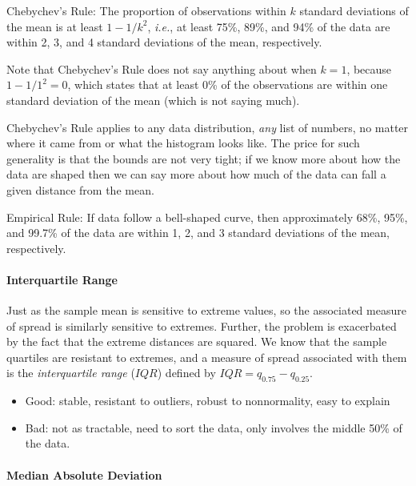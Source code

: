 \documentclass[captions=tableheading]{scrbook}
\begin{document}
\begin{fact}
Chebychev's Rule: The proportion of observations within \(k\) standard deviations of the mean is at least \(1-1/k^{2}\), \emph{i.e.}, at least 75\%, 89\%, and 94\% of the data are within 2, 3, and 4 standard deviations of the mean, respectively.
\end{fact}

Note that Chebychev's Rule does not say anything about when \(k=1\), because \(1-1/1^{2}=0\), which states that at least 0\% of the observations are within one standard deviation of the mean (which is not saying much).

Chebychev's Rule applies to any data distribution, \emph{any} list of numbers, no matter where it came from or what the histogram looks like. The price for such generality is that the bounds are not very tight; if we know more about how the data are shaped then we can say more about how much of the data can fall a given distance from the mean.

\begin{fact}
\label{fac:Empirical-Rule}
Empirical Rule: If data follow a bell-shaped curve, then approximately 68\%, 95\%, and 99.7\% of the data are within 1, 2, and 3 standard deviations of the mean, respectively. 
\end{fact}


\paragraph*{Interquartile Range}

Just as the sample mean is sensitive to extreme values, so the associated measure of spread is similarly sensitive to extremes. Further, the problem is exacerbated by the fact that the extreme distances are squared. We know that the sample quartiles are resistant to extremes, and a measure of spread associated with them is the \emph{interquartile range} (\(IQR\)) defined by \(IQR=q_{0.75}-q_{0.25}\).

\begin{itemize}
\item Good: stable, resistant to outliers, robust to nonnormality, easy to explain
\item Bad: not as tractable, need to sort the data, only involves the middle 50\% of the data.
\end{itemize}

\paragraph*{Median Absolute Deviation}
\end{document}
